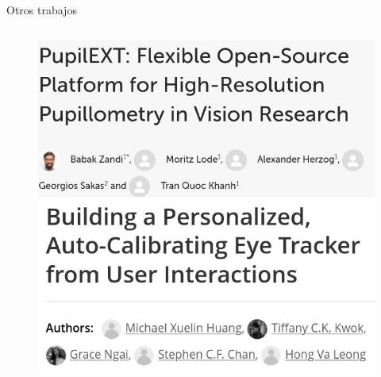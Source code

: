 \documentclass[aspectratio=169]{beamer}
\begin{document}
\begin{frame}{Otros trabajos}
  \begin{columns}
    \begin{column}{0.5\textwidth}
      \begin{figure}
        \centering
        \includegraphics[width=0.8\linewidth]{img/pupil-ext.png}
        \includegraphics[width=0.8\linewidth]{img/PACE.png}
      \end{figure}
    \end{column}


\end{columns}
\end{frame}
\end{document}
